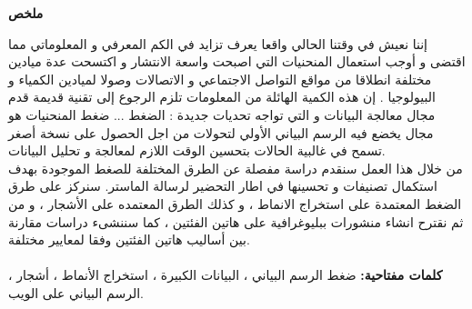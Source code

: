 \documentclass[12pt,a4paper]{report}
\begin{document}
\begin{center}
\thispagestyle{plain}

	\par
	\textbf{
		\vskip 0.5in
		\LARGE ملخص
			 \\[0.35in]}
\end{center}


	\par
\begin{otherlanguage}{arabic}

إننا نعيش في وقتنا الحالي واقعا يعرف تزايد في الكم المعرفي و المعلوماتي مما اقتضى و أوجب استعمال المنحنيات التي اصبحت واسعة الانتشار و اكتسحت عدة ميادين مختلفة انطلاقا من مواقع التواصل الاجتماعي و الاتصالات وصولا لميادين الكمياء و البيولوجيا .  إن  هذه الكمية الهائلة من المعلومات تلزم الرجوع إلى  تقنية قديمة قدم مجال  معالجة البيانات و التي تواجه تحديات جديدة : الضغط ... ضغط المنحنيات هو مجال يخضع فيه الرسم البياني الأولي لتحولات من اجل الحصول على نسخة أصغر  تسمح في  غالبية الحالات بتحسين الوقت اللازم لمعالجة و تحليل البيانات.\\  

من خلال هذا العمل سنقدم دراسة مفصلة عن الطرق المختلفة للصغط الموجودة بهدف استكمال تصنيفات و تحسينها في اطار التحضير لرسالة الماستر. سنركز على طرق الضغط المعتمدة على استخراج الانماط ، و كذلك الطرق المعتمده على الأشجار ، و من ثم نقترح انشاء منشورات ببليوغرافية على هاتين الفئتين ، كما سننشىء دراسات مقارنة بين أساليب هاتين 
 الفئتين وفقا لمعايير مختلفة.\\\\



 \textbf{ 
 كلمات مفتاحية:} ضغط الرسم البياني ، البيانات الكبيرة ، استخراج الأنماط ، أشجار ، الرسم البياني على الويب.
 
\end{otherlanguage}
 
\newpage

       
\end{document}
